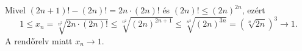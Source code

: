 \documentclass[11pt]{scrartcl}
\begin{document}
Mivel $(2n + 1)! - (2n)! = 2n \cdot (2n)!$ és $(2n)! \le (2n)^{2n}$, ezért
\[
	1
	\le x_n
	= \sqrt[n^2]{2n \cdot (2n)!}
	\le \sqrt[n^2]{(2n)^{2n + 1}}
	\le \sqrt[n^2]{(2n)^{3n}}
	= \left( \sqrt[n]{2n} \right)^3
	\to 1.
\]
A rendőrelv miatt $x_n \to 1$.
\end{document}
